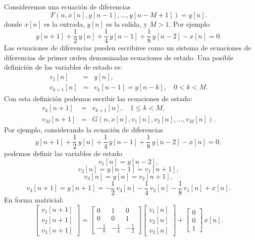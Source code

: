 Consideremos una ecuación de diferencias
\begin{equation}
	F(n, x[n], y[n-1],..., y[n-M+1]) = y[n].
\end{equation}
donde $x[n]$ es la entrada, $y[n]$ es la salida, y $M > 1$. Por ejemplo
\begin{equation}
	y[n+1] + \frac{1}{2} \, y[n] + \frac{1}{4} \, y[n-1] + \frac{1}{8} \, y[n-2] - x[n] = 0.
\end{equation}
Las ecuaciones de diferencias pueden escribirse como un sistema de ecuaciones de diferencias de primer orden denominadas ecuaciones de estado. Una posible definición de las variables de estado es:
\begin{eqnarray}
	v_{1}[n]   &=& y[n],                                               \\
	v_{k+1}[n] &=& v_{k}[n-1] = y[n-k], \quad 0 < k < M .
\end{eqnarray}
Con esta definición podemos escribir las ecuaciones de estado:
\begin{eqnarray}
	v_{k}[n+1] &=& v_{k+1}[n], \quad 1 \leq k < M,  \\
	v_{M}[n+1] &=& G(n, x[n], v_{1}[n], v_{2}[n],...,v_{M}[n]).
\end{eqnarray}
Por ejemplo, considerando la ecuación de diferencias
\begin{equation}
	y[n+1] + \frac{1}{2} \, y[n] + \frac{1}{4} \, y[n-1] + \frac{1}{8} \, y[n-2] - x[n] = 0,
\end{equation}
podemos definir las variables de estado
\begin{equation}
	v_{1}[n] = y[n-2],
\end{equation}
\begin{equation}
	v_{2}[n] = y[n-1] = v_{1}[n+1],
\end{equation}
\begin{equation}
	v_{3}[n] = y[n] = v_{2}[n+1],
\end{equation}
\begin{equation}
	v_{3}[n+1] = y[n+1] = - \frac{1}{2} \, v_{3}[n] - \frac{1}{4} \, v_{2}[n] - \frac{1}{8} \, v_{1}[n] + x[n].
\end{equation}
En forma matricial:
\begin{equation}
	\begin{bmatrix}
		v_{1}[n+1] \\
		v_{2}[n+1] \\
		v_{3}[n+1]
	\end{bmatrix} 
	= \begin{bmatrix}
		0 & 1 & 0 \\
		0 & 0 & 1 \\
		-\frac{1}{8} & -\frac{1}{4} & -\frac{1}{2}
	\end{bmatrix} 
	\begin{bmatrix}
		v_{1}[n]\\
		v_{2}[n]\\
		v_{3}[n]
	\end{bmatrix}
	+
	\begin{bmatrix}
		0 \\
		0 \\
		1
	\end{bmatrix} \, x[n].
\end{equation}

